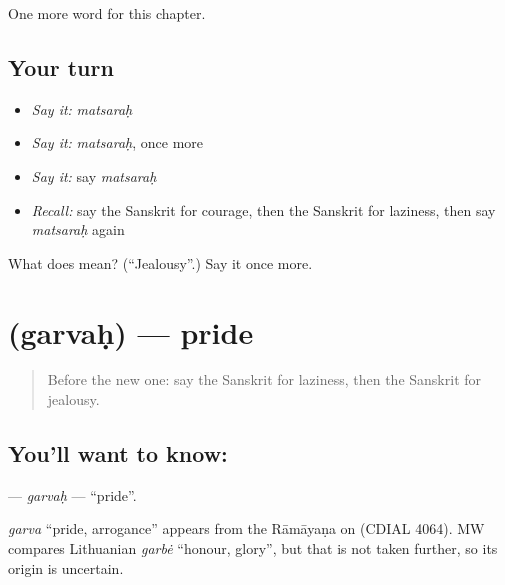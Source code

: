 \begin{grammarlens}[title={What you've built}]
One more word for this chapter.
\end{grammarlens}

\subsection*{Your turn}
\begin{itemize}
\raggedright
  \item \emph{Say it:} \emph{matsaraḥ}
  \item \emph{Say it:} \emph{matsaraḥ}, once more
  \item \emph{Say it:} say \emph{matsaraḥ}
  \item \emph{Recall:} say the Sanskrit for courage, then the Sanskrit for laziness, then say \emph{matsaraḥ} again
\end{itemize}

\begin{tcolorbox}[breakable,colback=teal!4,colframe=teal!35!black,title={Before you move on}]
What does  mean? (\textquotedblleft{}Jealousy\textquotedblright{}.) Say it once more.
\end{tcolorbox}
\section[\texorpdfstring{\sk{गर्वः} (garvaḥ)}{गर्वः (garvaḥ)}]{ (garvaḥ) — pride}

\label{lesson:SA-C151-garvah}



\begin{quote}
Before the new one: say the Sanskrit for laziness, then the Sanskrit for jealousy.
\end{quote}

\subsection*{You'll want to know: }
\textbf{} — \emph{garvaḥ} — \textquotedblleft{}pride\textquotedblright{}.

\begin{cousinweb}
\emph{garva} \textquotedblleft{}pride, arrogance\textquotedblright{} appears from the Rāmāyaṇa on (CDIAL 4064). MW compares Lithuanian \emph{garbė} \textquotedblleft{}honour, glory\textquotedblright{}, but that is not taken further, so its origin is uncertain.
\end{cousinweb}

